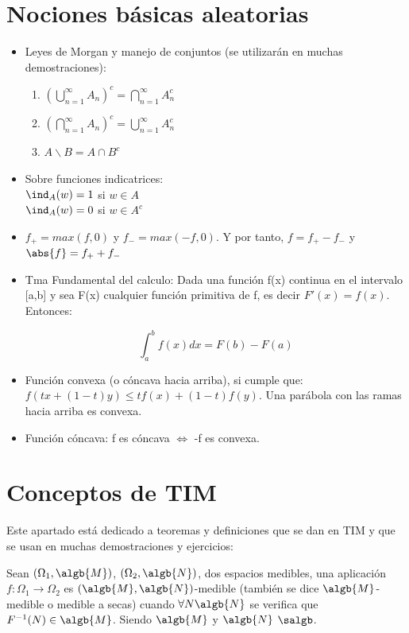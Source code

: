 \documentclass{apuntes}
\begin{document}
\section{Nociones básicas aleatorias}
\begin{itemize}
\item Leyes de Morgan y manejo de conjuntos (se utilizarán en muchas demostraciones):
\begin{enumerate}
\item $(\bigcup_{n=1}^{\infty}A_n)^c = \bigcap_{n=1}^{\infty}A_n^c$
\item $(\bigcap_{n=1}^{\infty}A_n)^c = \bigcup_{n=1}^{\infty}A_n^c$
\item $A \backslash B = A \cap B^c$

\end{enumerate}
\item Sobre funciones indicatrices:\\
$\ind_A(w)=1$ si $w \in A$\\
$\ind_A(w)=0$ si $w \in A^c$

\item $f_+ = max(f,0)$ y $f_- = max(-f,0)$. Y por tanto, $f=f_+ -f_-$ y $\abs{f}=f_+ +f_-$

\item Tma Fundamental del calculo: Dada una función f(x) continua en el intervalo [a,b] y sea F(x) cualquier función primitiva de f, es decir $F '(x) = f(x)$. Entonces:

\[
\int_a^b f(x)dx = F(b)-F(a)
\]
\item Función convexa (o cóncava hacia arriba), si cumple que: $f(tx+(1-t)y) \leq tf(x)+(1-t)f(y)$. Una parábola con las ramas hacia arriba es convexa.
\item Función cóncava: f es cóncava $\Leftrightarrow$ -f es convexa.
\end{itemize}

\section{Conceptos de TIM}
Este apartado está dedicado a teoremas y definiciones que se dan en TIM y que se usan en muchas demostraciones y ejercicios:

\begin{defn}
Sean $(\Omega_1, \algb{M})$, $(\Omega_2, \algb{N})$, dos espacios medibles, una aplicación $f:\Omega_1 \rightarrow \Omega_2$ es $(\algb{M}, \algb{N})$-medible (también se dice $\algb{M}$-medible o medible a secas) cuando $\forall N \algb{N}$ se verifica que $F^{-1}(N) \in \algb{M}$. Siendo $\algb{M}$ y $\algb{N}$ $\salgb$.
\end{defn}
\end{document}
